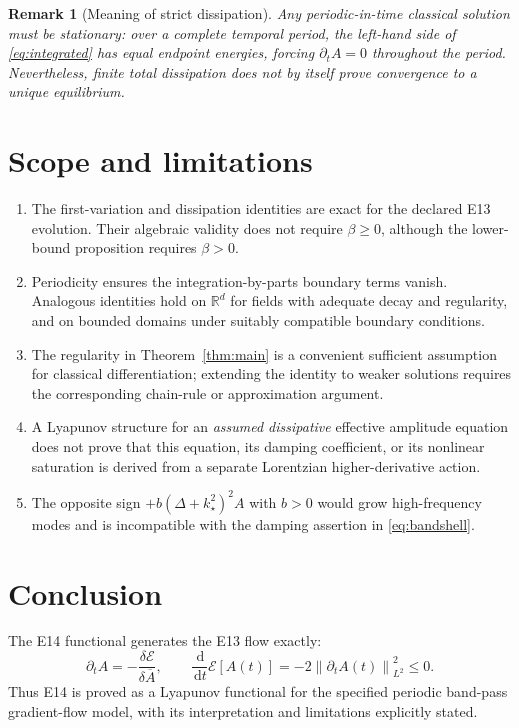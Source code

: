 \documentclass[11pt]{article}
\numberwithin{equation}{section}
\newtheorem{remark}{Remark}
\newcommand{\E}{\mathcal E}
\newcommand{\dd}{\,\mathrm d}
\newcommand{\norm}[1]{\left\lVert #1\right\rVert}
\begin{document}
\begin{remark}[Meaning of strict dissipation]
Any periodic-in-time classical solution must be stationary:
over a complete temporal period, the left-hand side of
\eqref{eq:integrated} has equal endpoint energies, forcing
$\partial_t A=0$ throughout the period. Nevertheless,
finite total dissipation does \emph{not} by itself prove
convergence to a unique equilibrium.
\end{remark}

\section{Scope and limitations}

\begin{enumerate}
\item The first-variation and dissipation identities are
exact for the declared E13 evolution. Their algebraic
validity does not require $\beta\ge0$, although the
lower-bound proposition requires $\beta>0$.
\item Periodicity ensures the integration-by-parts boundary
terms vanish. Analogous identities hold on $\mathbb R^d$
for fields with adequate decay and regularity, and on bounded
domains under suitably compatible boundary conditions.
\item The regularity in Theorem~\ref{thm:main} is a convenient
sufficient assumption for classical differentiation; extending
the identity to weaker solutions requires the corresponding
chain-rule or approximation argument.
\item A Lyapunov structure for an \emph{assumed dissipative}
effective amplitude equation does not prove that this
equation, its damping coefficient, or its nonlinear saturation
is derived from a separate Lorentzian higher-derivative action.
\item The opposite sign $+b(\Delta+k_\star^2)^2A$ with $b>0$
would grow high-frequency modes and is incompatible with
the damping assertion in \eqref{eq:bandshell}.
\end{enumerate}

\section{Conclusion}

The E14 functional generates the E13 flow exactly:
\[
\boxed{\quad
\partial_t A=-\frac{\delta\E}{\delta\overline A},
\qquad
\frac{\dd}{\dd t}\E[A(t)]
=-2\norm{\partial_t A(t)}_{L^2}^2\le0.
\quad}
\]
Thus E14 is proved as a Lyapunov functional for the specified
periodic band-pass gradient-flow model, with its interpretation
and limitations explicitly stated.
\end{document}

